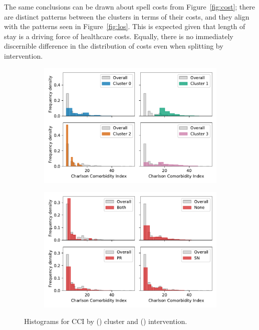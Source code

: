 \documentclass[11pt]{article}
\newlength{\imgwidth}
\begin{document}
The same conclusions can be drawn about spell costs from Figure~\ref{fig:cost};
there are distinct patterns between the clusters in terms of their costs, and
they align with the patterns seen in Figure~\ref{fig:los}. This is expected
given that length of stay is a driving force of healthcare costs. Equally, there
is no immediately discernible difference in the distribution of costs even when
splitting by intervention.

\begin{figure}
    \centering
    \begin{subfigure}{.5\imgwidth}
        \includegraphics[width=\linewidth]{img_cluster_charlson_gross}
        \caption{}\label{fig:cluster_charlson}
    \end{subfigure}\hfill%
    \begin{subfigure}{.5\imgwidth}
        \includegraphics[width=\linewidth]{img_intervention_charlson_gross}
        \caption{}\label{fig:intervention_charlson}
    \end{subfigure}
    \caption{%
        Histograms for CCI by () cluster and
        () intervention.
    }\label{fig:charlson}
\end{figure}
\end{document}
